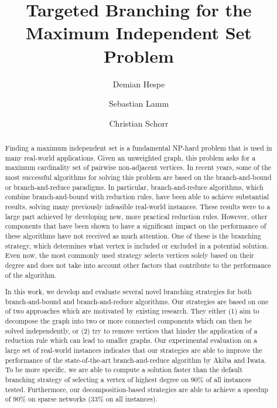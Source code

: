 \documentclass[a4paper,UKenglish,cleveref, autoref, thm-restate]{lipics-v2021}
\title{Targeted Branching for the Maximum Independent Set Problem} %
\author{Demian Hespe}{Karlsruhe Institute of Technology, Institute for
  Theoretical Informatics,
  Germany}{hespe@kit.edu}{https://orcid.org/0000-0001-6232-2951}{}
\author{Sebastian Lamm}{Karlsruhe Institute of Technology, Institute for
  Theoretical Informatics, Germany}{lamm@kit.edu}{https://orcid.org/0000-0001-7828-921X}{}
\author{Christian Schorr}{Karlsruhe Institute of Technology, Institute for
  Theoretical Informatics, Germany}{christian.schorr@student.kit.edu}{}{}
\begin{document}
\maketitle

\begin{abstract}
  Finding a maximum independent set is a fundamental NP-hard problem that is used in many real-world applications.
Given an unweighted graph, this problem asks for a maximum cardinality set of pairwise non-adjacent vertices.
In recent years, some of the most successful algorithms for solving this problem are based on the branch-and-bound or branch-and-reduce paradigms.
In particular, branch-and-reduce algorithms, which combine branch-and-bound with reduction rules, have been able to achieve substantial results, solving many previously infeasible real-world instances.
These results were to a large part achieved by developing new, more practical reduction rules.
However, other components that have been shown to have a significant impact on the performance of these algorithms have not received as much attention.
One of these is the branching strategy, which determines what vertex is included or excluded in a potential solution.
Even now, the most commonly used strategy selects vertices solely based on their degree and does not take into account other factors that contribute to the performance of the algorithm.

In this work, we develop and evaluate several novel branching strategies for both branch-and-bound and branch-and-reduce algorithms.
Our strategies are based on one of two approaches which are motivated by existing research. 
They either (1) aim to decompose the graph into two or more connected components which can then be solved independently, or (2) try to remove vertices that hinder the application of a reduction rule which can lead to smaller graphs.
Our experimental evaluation on a large set of real-world instances indicates
that our strategies are able to improve the performance of the state-of-the-art
branch-and-reduce algorithm by Akiba and Iwata. To be more specific,
we are able to compute a solution faster than the default branching strategy of selecting a vertex of highest degree on $90\%$ of all instances tested.
Furthermore, our decomposition-based strategies are able to achieve a speedup of $90\%$ on sparse networks ($33\%$ on all instances).

\end{abstract}

\newpage
\end{document}
